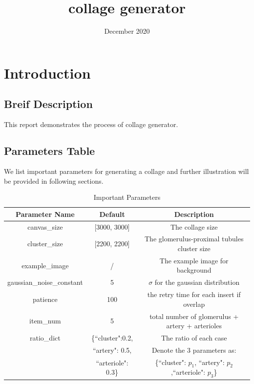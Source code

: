 \documentclass{article}
\title{collage generator}
\date{December 2020}
\begin{document}
\maketitle

\section{Introduction}
\subsection{Breif Description}
This report demonstrates the process of collage generator.
\subsection{Parameters Table}
We list important parameters for generating a collage and further illustration will be provided in following sections.
\begin{table}[!ht]
	\centering
	\begin{tabular}{|c|c|c|}
		\hline
		Parameter Name & Default  &  Description  \\ \hline
		canvas\_size  & [3000, 3000]  &  The collage size \\ \hline
		cluster\_size &  [2200, 2200] & The glomerulus-proximal tubules cluster size \\ \hline
		example\_image &  / &  The example image for background \\ \hline
		gaussian\_noise\_constant &  5 &  $\sigma$ for the gaussian distribution   \\ \hline
		patience & 100 & the retry time for each insert if overlap\\ \hline 
		item\_num& 5 &  total number of glomerulus + artery + arterioles  \\ \hline
		ratio\_dict&  \{``cluster":0.2, & The ratio of each case \\ &``artery": 0.5,& Denote the 3 parameters as:\\ &``arteriole": 0.3\}& \{``cluster": $p_1$, ``artery":  $p_2$,``arteriole": $p_3$\} \\ \hline
	\end{tabular}
	\caption{Important Parameters}
	\label{tbl: params}
\end{table}
\end{document}
